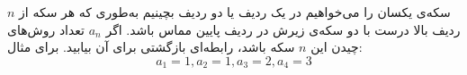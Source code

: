 \EXERCISE
$n$
سکه‌ی یکسان را می‌خواهیم در یک ردیف یا دو ردیف بچینیم به‌طوری که هر سکه از ردیف بالا درست با دو سکه‌ی زیرش در ردیف پایین مماس باشد. اگر
$a_n$
تعداد روش‌های چیدن این
$n$
سکه باشد، رابطه‌ای بازگشتی برای آن بیابید. برای مثال:
$$a_1 = 1, a_2 = 1, a_3 = 2, a_4 = 3$$